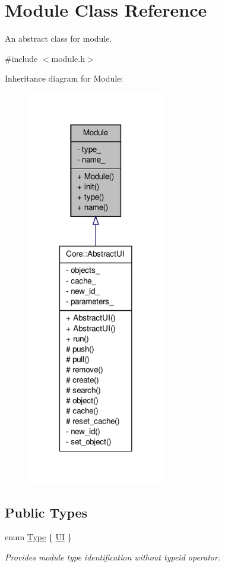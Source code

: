 \hypertarget{classModule}{
\section{Module Class Reference}
\label{d3/d9c/classModule}
}


An abstract class for module.  




{\ttfamily \#include $<$module.h$>$}



Inheritance diagram for Module:
\nopagebreak
\begin{figure}[H]
\begin{center}
\leavevmode
\includegraphics[width=170pt]{d6/d1a/classModule__inherit__graph}
\end{center}
\end{figure}
\subsection*{Public Types}
\begin{DoxyCompactItemize}
\item 
enum \hyperlink{classModule_aa9bdbe3fbb5096298ed3a404fb0d2ccd}{Type} \{ \hyperlink{classModule_aa9bdbe3fbb5096298ed3a404fb0d2ccda55575c34a17869158e59e881b0691fc1}{UI}
 \}
\begin{DoxyCompactList}\small\item\em Provides module type identification without typeid operator. \item\end{DoxyCompactList}\end{DoxyCompactItemize}
